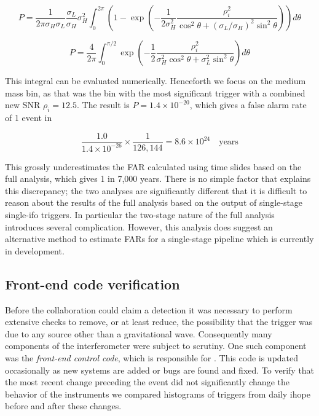 \begin{equation}
P = 
\frac{1}{2\pi \sigma_H \sigma_L} 
\frac{\sigma_L}{\sigma_H}
\sigma_H^2
\int_0^{2\pi}
\left( 1 - 
\exp\left(
  -\frac{1}{2\sigma_H^2} 
   \frac{\rho_i^2}
        {\cos^2\theta + (\sigma_L/\sigma_H)^2 \sin^2\theta} 
\right)
\right)
d\theta
\end{equation}

\begin{equation}
P = \frac{4}{2\pi}
\int_0^{\pi/2}
\exp\left(
  -\frac{1}{2} 
   \frac{\rho_i^2}
        {\sigma_H^2 \cos^2\theta + \sigma_L^2 \sin^2\theta} 
\right)
d\theta
\end{equation}

\fi

This integral can be evaluated numerically.  Henceforth we focus on
the medium mass bin, as that was the bin with the most significant
trigger with a combined new SNR $\rho_i = 12.5$.  The result is
$P = 1.4 \times 10^{-20}$, which gives a false alarm rate of
1 event in 

\begin{equation}
\frac{1.0}{1.4 \times 10^{-26}} \times \frac{1}{126,144}
= 8.6\times 10^{24}\quad\textrm{years}
\end{equation}

This grossly underestimates the FAR calculated using time slides based
on the full analysis, which gives 1 in 7,000 years.  There is no
simple factor that explains this discrepancy; the two analyses are
significantly different that it is difficult to reason about the
results of the full analysis based on the output of single-stage
single-ifo triggers.  In particular the two-stage nature of the full
analysis introduces several complication.  However, this analysis does
suggest an alternative method to estimate FARs for a single-stage
pipeline which is currently in development.

\subsection{Front-end code verification}


Before the collaboration could claim a detection it was necessary to
perform extensive checks to remove, or at least reduce, the
possibility that the trigger was due to any source other than a
gravitational wave.  Consequently many components of the
interferometer were subject to scrutiny.  One such component was the
\emph{front-end control code}, which is responsible for .  This code is updated occasionally as new systems are
added or bugs are found and fixed.   To verify that the most recent
change preceding the event did not significantly change the behavior
of the instruments we compared histograms of triggers from daily ihope
before and after these changes.

